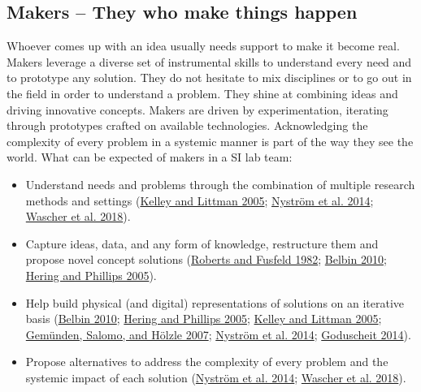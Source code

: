 \documentclass[AMA,STIX1COL,APA,STIX2COL]{WileyNJD-v2}
\providecommand{\tightlist}{%
  \setlength{\itemsep}{0pt}\setlength{\parskip}{0pt}}
\begin{document}
\hypertarget{makers-they-who-make-things-happen}{%
\subsection{Makers -- They who make things
happen}\label{makers-they-who-make-things-happen}}

Whoever comes up with an idea usually needs support to make it become
real. Makers leverage a diverse set of instrumental skills to understand
every need and to prototype any solution. They do not hesitate to mix
disciplines or to go out in the field in order to understand a problem.
They shine at combining ideas and driving innovative concepts. Makers
are driven by experimentation, iterating through prototypes crafted on
available technologies. Acknowledging the complexity of every problem in
a systemic manner is part of the way they see the world. What can be
expected of makers in a SI lab team:

\begin{itemize}
\tightlist
\item
  Understand needs and problems through the combination of multiple
  research methods and settings
  (\protect\hyperlink{ref-Kelley2005}{Kelley and Littman 2005};
  \protect\hyperlink{ref-Nystrom2014}{Nyström et al. 2014};
  \protect\hyperlink{ref-Wascher2018}{Wascher et al. 2018}).
\item
  Capture ideas, data, and any form of knowledge, restructure them and
  propose novel concept solutions
  (\protect\hyperlink{ref-Roberts1982}{Roberts and Fusfeld 1982};
  \protect\hyperlink{ref-Belbin2010}{Belbin 2010};
  \protect\hyperlink{ref-Hering2005}{Hering and Phillips 2005}).
\item
  Help build physical (and digital) representations of solutions on an
  iterative basis (\protect\hyperlink{ref-Belbin2010}{Belbin 2010};
  \protect\hyperlink{ref-Hering2005}{Hering and Phillips 2005};
  \protect\hyperlink{ref-Kelley2005}{Kelley and Littman 2005};
  \protect\hyperlink{ref-Gemunden2007}{Gemünden, Salomo, and Hölzle
  2007}; \protect\hyperlink{ref-Nystrom2014}{Nyström et al. 2014};
  \protect\hyperlink{ref-Goduscheit2014}{Goduscheit 2014}).
\item
  Propose alternatives to address the complexity of every problem and
  the systemic impact of each solution
  (\protect\hyperlink{ref-Nystrom2014}{Nyström et al. 2014};
  \protect\hyperlink{ref-Wascher2018}{Wascher et al. 2018}).
\end{itemize}
\end{document}
